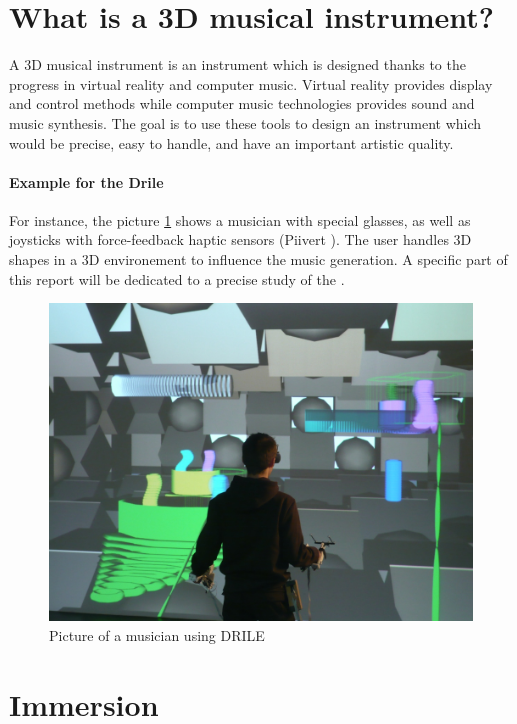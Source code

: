 \newpage
\section{What is a 3D musical instrument?}
A 3D musical instrument is an instrument which is designed thanks to the progress in virtual reality and computer music.
Virtual reality provides display and control methods while computer music technologies provides sound and music synthesis. The goal is to use these tools to design an instrument which would be precise, easy to handle, and have an important artistic quality.

\paragraph{Example for the Drile}
For instance, the picture \ref{fig:drile} shows a musician with special glasses, as well as joysticks with force-feedback haptic sensors (Piivert \cite{berthaut2010piivert}). 
The user handles 3D shapes in a 3D environement to influence the music generation. A specific part of this report will be dedicated to a precise study of the .

\begin{figure}[t]
\centering
\includegraphics[scale=0.3]{image/drile.jpg}
\caption{Picture of a musician using DRILE}
\label{fig:drile}
\end{figure}

\newpage
\section{Immersion}
